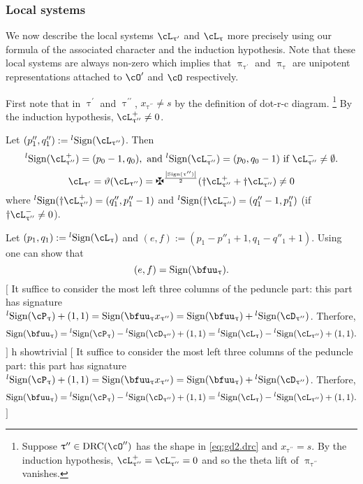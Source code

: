 \documentclass[12pt,a4paper]{amsart}
\newcommand{\trivial}[2][]{\if\relax\detokenize{#1}\relax
  {%
      \color{orange} \vspace{0em} $[$  #2 $]$
      \color{black}
  }
  \else
\ifx#1h
\ifcsname showtrivial\endcsname
{%
    \color{orange} \vspace{0em}  $[$ #2 $]$
    \color{black}
}
\fi
\else {\red Wrong argument!} \fi
\fi
}
\def\abs#1{\left|{#1}\right|}
\numberwithin{equation}{section}
\theoremstyle{remark}
\def\lsign{{}^l\mathrm{Sign}}
\def\ssign{\mathrm{Sign}}
\def\drc{\mathrm{DRC}}
\def\cOp{\cO^{\prime}}
\def\cOpp{\cO^{\prime\prime}}
\def\pcL{\cL^+}
\def\ncL{\cL^-}
\def\uptaup{\uptau^{\prime}}
\def\uptaupp{\uptau^{\prime\prime}}
\begin{document}
\subsubsection{Local systems}
We now describe the local systems $\cL_{\uptaup}$ and $\cL_{\uptau}$ more
precisely using our formula of the associated character and the induction
hypothesis. Note that these local systems are always non-zero which implies that
$\uppi_{\uptaup}$ and $\uppi_{\uptau}$ are unipotent representations attached to
$\cOp$ and $\cO$ respectively.

First note that in $\uptaup$ and $\uptaupp$, $x_{\uptaupp}\neq s$ by the definition of
dot-r-c diagram.
\footnote{
  Suppose $\uptaupp\in \drc(\cOpp)$ has the shape in \eqref{eq:gd2.drc} and
  $x_{\uptaupp}=s$. By the induction hypothesis,   $\pcL_{\uptaupp}=\ncL_{\uptaupp}=0$ and so
  the theta lift of $\uppi_{\uptaupp}$ vanishes.
}
By the induction hypothesis, $\cL_{\uptaupp}^{+}\neq 0$.



Let $(p''_{1},q''_{1}) := \lsign(\cL_{\uptaupp})$.
Then
\begin{equation}\label{eq:lsign.1}
\lsign(\pcL_{\uptaupp}) = (p_{0}-1,q_{0}), \text{ and }
\lsign(\ncL_{\uptaupp})=(p_{0},q_{0}-1) \text{ if } \ncL_{\uptaupp}\neq \emptyset.
\end{equation}
\begin{equation}\label{eq:LS.taup}
  \cL_{\uptaup} = \vartheta(\cL_{\uptaupp}) = \maltese^{\frac{\abs{\ssign(\uptaupp)}}{2}}
  (\dagger \pcL_{\uptaupp} + \dagger \ncL_{\uptaupp}) \neq 0
\end{equation}
where
$\lsign(\dagger\pcL_{\uptaupp}) = (q''_{1}, p''_{1}-1)$ and
$\lsign(\dagger\ncL_{\uptaupp})=(q''_{1}-1,p''_{1})$ (if
$\dagger\ncL_{\uptaupp}\neq 0$).

Let $(p_{1},q_{1}) := \lsign(\cL_{\uptau})$ and
$(e,f):=(p_{1}-p''_{1}+1, q_{1}-q''_{1}+1)$. Using 
one can show that
\[
  (e,f)=\ssign(\bfuu_{\uptau}).
\]
\trivial[]{ It suffice to consider the most left three columns of the peduncle
  part: this part has signature
  $\lsign(\cP_{\uptau}) +(1,1) = \ssign(\bfuu_{\uptau}x_{\uptaupp})= \ssign(\bfuu_{\uptau})+\lsign(\cD_{\uptaupp})$.
  Therfore,
  \[\ssign(\bfuu_{\uptau}) = \lsign(\cP_{\uptau})-\lsign(\cD_{\uptaupp})
  + (1,1) = \lsign(\cL_{\uptau})-\lsign(\cL_{\uptaupp})+(1,1).
  \]
}
\end{document}
